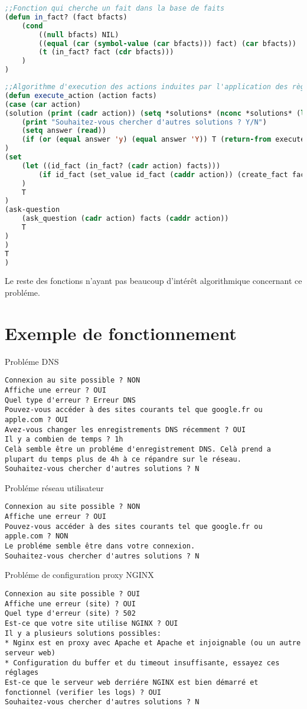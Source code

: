 \documentclass[a4paper, 10pt, leqno]{report}
\theoremstyle{plain}
\begin{document}
\begin{lstlisting}[language=lisp]
;;Fonction qui cherche un fait dans la base de faits
(defun in_fact? (fact bfacts)
	(cond
		((null bfacts) NIL)
		((equal (car (symbol-value (car bfacts))) fact) (car bfacts))
		(t (in_fact? fact (cdr bfacts)))
	)
)
\end{lstlisting}


\begin{lstlisting}[language=lisp]
;;Algorithme d'execution des actions induites par l'application des règles
(defun execute_action (action facts)
(case (car action)
(solution (print (cadr action)) (setq *solutions* (nconc *solutions* (list (cadr action))))
	(print "Souhaitez-vous chercher d'autres solutions ? Y/N")
	(setq answer (read))
	(if (or (equal answer 'y) (equal answer 'Y)) T (return-from execute_action NIL))
)
(set 
	(let ((id_fact (in_fact? (cadr action) facts)))
		(if id_fact (set_value id_fact (caddr action)) (create_fact facts (cadr action) T (caddr action)))
	)
	T	
)
(ask-question 
	(ask_question (cadr action) facts (caddr action))
	T
)
)
T
)
\end{lstlisting}

Le reste des fonctions n'ayant pas beaucoup d'intérêt algorithmique concernant ce probléme.

\section{Exemple de fonctionnement}

Probléme DNS
\begin{lstlisting}
Connexion au site possible ? NON
Affiche une erreur ? OUI
Quel type d'erreur ? Erreur DNS
Pouvez-vous accéder à des sites courants tel que google.fr ou apple.com ? OUI
Avez-vous changer les enregistrements DNS récemment ? OUI
Il y a combien de temps ? 1h
Celà semble être un probléme d'enregistrement DNS. Celà prend a plupart du temps plus de 4h à ce répandre sur le réseau.
Souhaitez-vous chercher d'autres solutions ? N
\end{lstlisting}

Probléme réseau utilisateur
\begin{lstlisting}
Connexion au site possible ? NON
Affiche une erreur ? OUI
Pouvez-vous accéder à des sites courants tel que google.fr ou apple.com ? NON
Le probléme semble être dans votre connexion.
Souhaitez-vous chercher d'autres solutions ? N
\end{lstlisting}

Probléme de configuration proxy NGINX
\begin{lstlisting}
Connexion au site possible ? OUI
Affiche une erreur (site) ? OUI
Quel type d'erreur (site) ? 502
Est-ce que votre site utilise NGINX ? OUI
Il y a plusieurs solutions possibles:
* Nginx est en proxy avec Apache et Apache et injoignable (ou un autre serveur web)
* Configuration du buffer et du timeout insuffisante, essayez ces réglages
Est-ce que le serveur web derriére NGINX est bien démarré et fonctionnel (verifier les logs) ? OUI
Souhaitez-vous chercher d'autres solutions ? N
\end{lstlisting}
\end{document}
